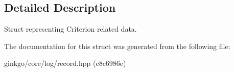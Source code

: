 \subsection{Detailed Description}
Struct representing Criterion related data. 

The documentation for this struct was generated from the following file\+:\begin{DoxyCompactItemize}
\item 
ginkgo/core/log/record.\+hpp (c8c6986e)\end{DoxyCompactItemize}
